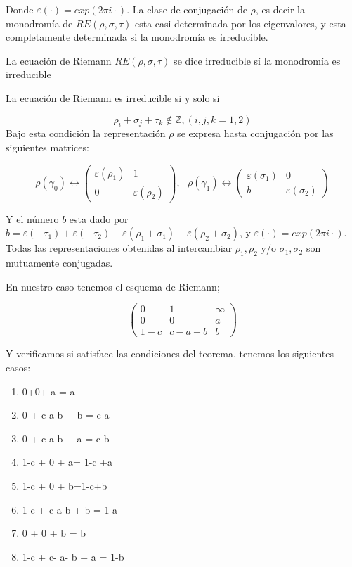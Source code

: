 Donde $\varepsilon (\cdot) = exp(2 \pi i \cdot)$. La clase de conjugaci\'on de $\rho$, es decir la monodrom\'ia de $RE(\rho,\sigma,\tau)$ esta casi determinada por los eigenvalores, y esta completamente determinada si la monodrom\'ia es irreducible.

\begin{defn}La ecuaci\'on de Riemann $RE(\rho,\sigma,\tau)$ se dice irreducible s\'i la monodrom\'ia es irreducible
\end{defn}

\begin{thm} \label{riemann-irreducible}

La ecuaci\'on de Riemann es irreducible si y solo si

$$\rho_{i} + \sigma_{j} + \tau_{k} \notin \mathbb{Z}, (i,j,k=1,2)  $$
Bajo esta condici\'on la representaci\'on $\rho $ se expresa hasta conjugaci\'on por las siguientes matrices:

$$ \rho (\gamma_{0}) \leftrightarrow  \begin{pmatrix}
 \varepsilon(\rho_{1})& 1\\
 0& \varepsilon(\rho_{2})
 \end{pmatrix}  ,\ \ \
\rho (\gamma_{1}) \leftrightarrow \begin{pmatrix}
 \varepsilon(\sigma_{1})& 0\\
 b& \varepsilon(\sigma_{2})
 \end{pmatrix}
$$

 Y el n\'umero $b$ esta dado por $b= \varepsilon(-\tau_{1}) + \varepsilon(-\tau_{2}) - \varepsilon(\rho_{1} + \sigma_{1}) - \varepsilon(\rho_{2} + \sigma_{2})$, y $\varepsilon(\cdot) =exp(2 \pi i \cdot)$. Todas las representaciones  obtenidas al intercambiar $\rho_{1},\rho_{2}$ y/o $\sigma_{1},\sigma_{2}$ son mutuamente conjugadas.

\end{thm}

En nuestro caso tenemos el esquema de Riemann;

\[ \left( \begin{array}{ccc}
0 & 1 & \infty \\
0 & 0 & a \\
1-c &c-a-b & b  \end{array} \right)\]

Y verificamos si satisface las condiciones del teorema, tenemos los siguientes casos:


\begin{enumerate}
\item 0+0+ a = a
\item 0 + c-a-b + b = c-a
\item 0 + c-a-b + a = c-b
\item 1-c + 0 + a= 1-c +a
\item 1-c + 0 + b=1-c+b
\item 1-c + c-a-b + b = 1-a
\item 0 + 0 + b = b
\item 1-c + c- a- b + a = 1-b
\end{enumerate}


